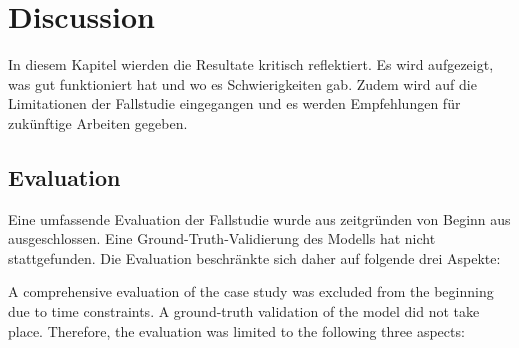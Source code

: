 \chapter{Discussion}
\label{sec:discussion}

\begin{German}
    In diesem Kapitel wierden die Resultate kritisch reflektiert. Es wird aufgezeigt, was gut funktioniert hat und wo es Schwierigkeiten gab. Zudem wird auf die Limitationen der Fallstudie eingegangen und es werden Empfehlungen für zukünftige Arbeiten gegeben.
\end{German}

\section{Evaluation}
\begin{German}
    Eine umfassende Evaluation der Fallstudie wurde aus zeitgründen von Beginn aus ausgeschlossen. Eine Ground-Truth-Validierung des Modells hat nicht stattgefunden. Die Evaluation beschränkte sich daher auf folgende drei Aspekte:
\end{German}

\begin{English}
    A comprehensive evaluation of the case study was excluded from the beginning due to time constraints. A ground-truth validation of the model did not take place. Therefore, the evaluation was limited to the following three aspects:
\end{English}

